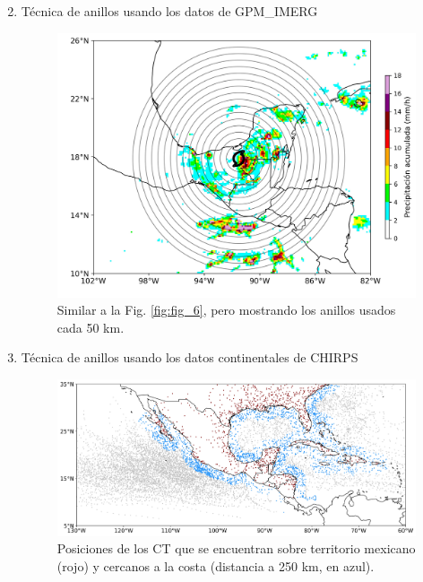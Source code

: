 \begin{frame}
\begin{enumerate}
\setcounter{enumi}{1}
\item Técnica de anillos usando los datos de GPM\_IMERG
      \begin{figure}
            \centering
            \includegraphics[scale = 0.4]{Images/Figures/Fig_2_6.jpeg}
            \caption{Similar a la Fig. \ref{fig:fig_6}, pero mostrando los anillos usados cada 50 km.}
            \label{fig:fig_7}
        \end{figure}
\end{enumerate}
\end{frame}

\begin{frame}
\begin{enumerate}
\setcounter{enumi}{2}
\item Técnica de anillos usando los datos continentales de CHIRPS
      \begin{figure}
            \centering
            \includegraphics[scale = 0.24]{Images/Figures/Fig_2_7.jpeg}
            \caption{Posiciones de los CT que se encuentran sobre territorio mexicano (rojo) y cercanos a la costa (distancia a 250 km, en azul).}
            \label{fig:fig_8}
        \end{figure}
\end{enumerate}
\end{frame}


